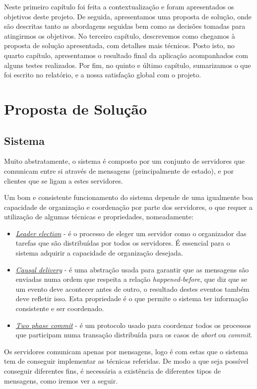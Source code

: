 \documentclass[12pt, a4paper]{report}
\begin{document}
Neste primeiro capítulo foi feita a contextualização e foram apresentados os objetivos deste projeto.
De seguida, apresentamos uma proposta de solução, onde são descritas tanto as abordagens seguidas bem como as decisões tomadas para atingirmos os objetivos.
No terceiro capítulo, descrevemos como chegamos à proposta de solução apresentada, com detalhes mais técnicos.
Posto isto, no quarto capítulo, apresentamos o resultado final da aplicação acompanhados com alguns testes realizados.
Por fim, no quinto e último capítulo, sumarizamos o que foi escrito no relatório, e a nossa satisfação global com o projeto.


\chapter{Proposta de Solução}
\section{Sistema}
Muito abstratamente, o sistema é composto por um conjunto de servidores que comunicam entre si através de mensagens (principalmente de estado), e por clientes que se ligam a estes servidores.

Um bom e consistente funcionamento do sistema depende de uma igualmente boa capacidade de organização e coordenação por parte dos servidores, o que requer a utilização de algumas técnicas e propriedades, nomeadamente:

\begin{itemize}
    \item \underline{\textit{Leader election}} - é o processo de eleger um servidor como o organizador das tarefas que são distribuídas por todos os servidores. É essencial para o sistema adquirir a capacidade de organização desejada.
    \item \underline{\textit{Causal delivery}} - é uma abstração usada para garantir que as mensagens são enviadas numa ordem que respeita a relação \textit{happened-before}, que diz que se um evento deve acontecer antes de outro, o resultado destes eventos também deve refletir isso. Esta propriedade é o que permite o sistema ter informação consistente e ser coordenado.
    \item \underline{\textit{Two phase commit}} - é um protocolo usado para coordenar todos os processos que participam numa transação distribuída para os casos de \textit{abort} ou \textit{commit}.
\end{itemize}

Os servidores comunicam apenas por mensagens, logo é com estas que o sistema tem de conseguir implementar as técnicas referidas. De modo a que seja possível conseguir diferentes fins, é necessária a existência de diferentes tipos de mensagens, como iremos ver a seguir.
\end{document}
